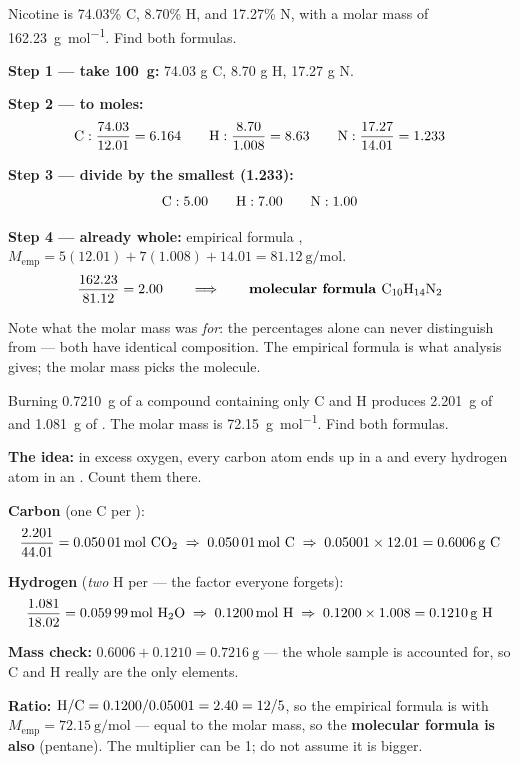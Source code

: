\documentclass{apchem-worksheet}
\begin{document}
\begin{workedexample}
Nicotine is 74.03\% C, 8.70\% H, and 17.27\% N, with a molar mass of
\SI{162.23}{\gram\per\mole}. Find both formulas.

\textbf{Step 1 --- take \SI{100}{\gram}:} 74.03 g C, 8.70 g H, 17.27 g N.

\textbf{Step 2 --- to moles:}
\[ \ce{C}: \frac{74.03}{12.01} = 6.164 \qquad
   \ce{H}: \frac{8.70}{1.008} = 8.63 \qquad
   \ce{N}: \frac{17.27}{14.01} = 1.233 \]

\textbf{Step 3 --- divide by the smallest (1.233):}
\[ \ce{C}: 5.00 \qquad \ce{H}: 7.00 \qquad \ce{N}: 1.00 \]

\textbf{Step 4 --- already whole:} empirical formula ,
$M_{\text{emp}} = 5(12.01) + 7(1.008) + 14.01 =
\SI{81.12}{\gram\per\mole}$.
\[ \frac{162.23}{81.12} = 2.00 \qquad\Longrightarrow\qquad
   \textbf{molecular formula } \ce{C10H14N2} \]

Note what the molar mass was \emph{for}: the percentages alone can never
distinguish  from  --- both have identical
composition. The empirical formula is what analysis gives; the molar mass
picks the molecule.
\end{workedexample}

\begin{workedexample}
Burning \SI{0.7210}{\gram} of a compound containing only C and H produces
\SI{2.201}{\gram} of  and \SI{1.081}{\gram} of . The molar
mass is \SI{72.15}{\gram\per\mole}. Find both formulas.

\textbf{The idea:} in excess oxygen, every carbon atom ends up in a
 and every hydrogen atom in an . Count them there.

\textbf{Carbon} (one C per ):
\[ \frac{2.201}{44.01} = \SI{0.05001}{\mole}~\ce{CO2}
   \;\Rightarrow\; \SI{0.05001}{\mole}~\ce{C}
   \;\Rightarrow\; 0.05001 \times 12.01 = \SI{0.6006}{\gram}~\ce{C} \]

\textbf{Hydrogen} (\emph{two} H per  --- the factor everyone
forgets):
\[ \frac{1.081}{18.02} = \SI{0.05999}{\mole}~\ce{H2O}
   \;\Rightarrow\; \SI{0.1200}{\mole}~\ce{H}
   \;\Rightarrow\; 0.1200 \times 1.008 = \SI{0.1210}{\gram}~\ce{H} \]

\textbf{Mass check:} $0.6006 + 0.1210 = \SI{0.7216}{\gram}$ --- the whole
sample is accounted for, so C and H really are the only elements.

\textbf{Ratio:} $\ce{H}/\ce{C} = 0.1200/0.05001 = 2.40 = 12/5$, so the
empirical formula is  with
$M_{\text{emp}} = \SI{72.15}{\gram\per\mole}$ --- equal to the molar mass,
so the \textbf{molecular formula is also } (pentane). The
multiplier can be 1; do not assume it is bigger.
\end{workedexample}
\end{document}
